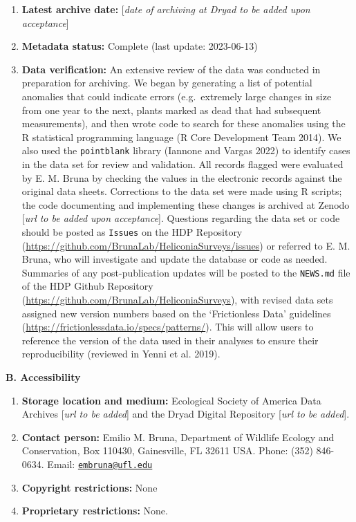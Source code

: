 \documentclass[
  12pt,
  man, donotrepeattitle,floatsintext]{apa6}
\begin{document}
\begin{enumerate}
\def\labelenumi{\arabic{enumi}.}
\setcounter{enumi}{1}
\item
  \textbf{Latest archive date:} {[}\emph{date of archiving at Dryad to be added upon acceptance}{]}
\item
  \textbf{Metadata status:} Complete (last update:
  2023-06-13)
\item
  \textbf{Data verification:} An extensive review of the data was conducted in preparation for archiving. We began by generating a list of potential anomalies that could indicate errors (e.g.~extremely large changes in size from one year to the next, plants marked as dead that had subsequent measurements), and then wrote code to search for these anomalies using the R statistical programming language (R Core Development Team 2014). We also used the \texttt{pointblank} library (Iannone and Vargas 2022) to identify cases in the data set for review and validation. All records flagged were evaluated by E. M. Bruna by checking the values in the electronic records against the original data sheets. Corrections to the data set were made using R scripts; the code documenting and implementing these changes is archived at Zenodo {[}\emph{url to be added upon acceptance}{]}. Questions regarding the data set or code should be posted as \texttt{Issues} on the HDP Repository (\url{https://github.com/BrunaLab/HeliconiaSurveys/issues}) or referred to E. M. Bruna, who will investigate and update the database or code as needed. Summaries of any post-publication updates will be posted to the \texttt{NEWS.md} file of the HDP Github Repository (\url{https://github.com/BrunaLab/HeliconiaSurveys}), with revised data sets assigned new version numbers based on the `Frictionless Data' guidelines (\url{https://frictionlessdata.io/specs/patterns/}). This will allow users to reference the version of the data used in their analyses to ensure their reproducibility (reviewed in Yenni et al. 2019).
\end{enumerate}

\noindent 
\textbf{B. Accessibility}

\begin{enumerate}
\def\labelenumi{\arabic{enumi}.}
\item
  \textbf{Storage location and medium:} Ecological Society of America Data Archives {[}\emph{url to be added}{]} and the Dryad Digital Repository {[}\emph{url to be added}{]}.
\item
  \textbf{Contact person:} Emilio M. Bruna, Department of Wildlife Ecology and Conservation, Box 110430, Gainesville, FL 32611 USA. Phone: (352) 846-0634. Email: \href{mailto:embruna@ufl.edu}{\nolinkurl{embruna@ufl.edu}}
\item
  \textbf{Copyright restrictions:} None
\item
  \textbf{Proprietary restrictions:} None.
\end{enumerate}
\end{document}
